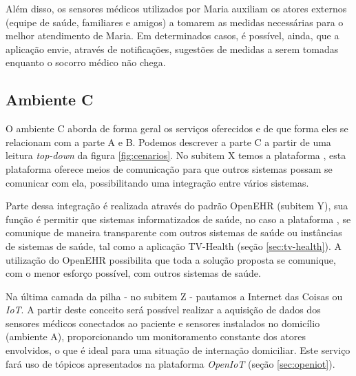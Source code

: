 Além disso, os sensores médicos utilizados por Maria auxiliam os atores
externos (equipe de saúde, familiares e amigos) a tomarem as medidas
necessárias para o melhor atendimento de Maria.  Em determinados casos, é
possível, ainda, que a aplicação envie, através de notificações, sugestões de
medidas a serem tomadas enquanto o socorro médico não chega.

\subsection{Ambiente C} \label{subsec:ambiente-c}

O ambiente C aborda de forma geral os serviços oferecidos e de que forma eles se
relacionam com a parte A e B. Podemos descrever a parte C a partir de uma leitura 
\textit{top-down} da figura \ref{fig:cenarios}. No subitem X temos a plataforma
\nextsaude[], esta plataforma oferece meios de comunicação para que outros sistemas
possam se comunicar com ela, possibilitando uma integração entre vários sistemas.

Parte dessa integração é realizada através do padrão OpenEHR (subitem Y), sua 
função é permitir que sistemas informatizados de saúde, no caso a plataforma
\nextsaude[], se comunique de maneira transparente com outros sistemas de saúde ou
instâncias de sistemas de saúde, tal como a aplicação TV-Health (seção
\vref{sec:tv-health}). A utilização do OpenEHR possibilita que toda a solução
proposta se comunique, com o menor esforço possível, com outros sistemas de 
saúde.

Na última camada da pilha - no subitem Z - pautamos a Internet das Coisas ou
\textit{IoT}. A partir deste conceito será possível realizar a aquisição de
dados dos sensores médicos conectados ao paciente e sensores instalados no domicílio
(ambiente A), proporcionando um monitoramento constante dos atores envolvidos, 
o que é ideal para uma situação de internação domiciliar. Este serviço fará uso 
de tópicos apresentados na plataforma \textit{OpenIoT}
(seção \vref{sec:openiot}).



